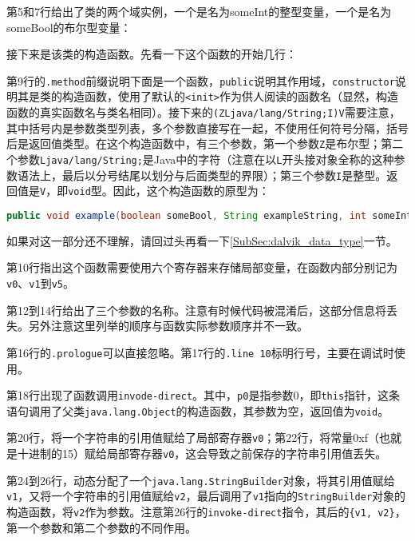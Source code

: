 第5和7行给出了类的两个域实例，一个是名为someInt的整型变量，一个是名为someBool的布尔型变量：


接下来是该类的构造函数。先看一下这个函数的开始几行：

第9行的\lstinline!.method!前缀说明下面是一个函数，\lstinline!public!说明其作用域，\lstinline!constructor!说明其是类的构造函数，使用了默认的\lstinline!<init>!作为供人阅读的函数名（显然，构造函数的真实函数名与类名相同）。接下来的\lstinline!(ZLjava/lang/String;I)V!需要注意，其中括号内是参数类型列表，多个参数直接写在一起，不使用任何符号分隔，括号后是返回值类型。在这个构造函数中，有三个参数，第一个参数\lstinline!Z!是布尔型；第二个参数\lstinline!Ljava/lang/String;!是Java中的字符（注意在以\lstinline!L!开头接对象全称的这种参数语法上，最后以分号结尾以划分与后面类型的界限）；第三个参数\lstinline!I!是整型。返回值是\lstinline!V!，即\lstinline!void!型。因此，这个构造函数的原型为：
\begin{lstlisting}[language=java, numbers=none]
public void example(boolean someBool, String exampleString, int someInt);
\end{lstlisting}
如果对这一部分还不理解，请回过头再看一下\ref{SubSec:dalvik_data_type}一节。

第10行指出这个函数需要使用六个寄存器来存储局部变量，在函数内部分别记为\lstinline!v0!、\lstinline!v1!到\lstinline!v5!。

第12到14行给出了三个参数的名称。注意有时候代码被混淆后，这部分信息将丢失。另外注意这里列举的顺序与函数实际参数顺序并不一致。


第16行的\lstinline!.prologue!可以直接忽略。第17行的\lstinline!.line 10!标明行号，主要在调试时使用。

第18行出现了函数调用\lstinline!invode-direct!。其中，\lstinline!p0!是指参数0，即\lstinline!this!指针，这条语句调用了父类\lstinline!java.lang.Object!的构造函数，其参数为空，返回值为\lstinline!void!。


第20行，将一个字符串的引用值赋给了局部寄存器\lstinline!v0!；第22行，将常量0xf（也就是十进制的15）赋给局部寄存器\lstinline!v0!，这会导致之前保存的字符串引用值丢失。

第24到26行，动态分配了一个\lstinline!java.lang.StringBuilder!对象，将其引用值赋给\lstinline!v1!，又将一个字符串的引用值赋给\lstinline!v2!，最后调用了\lstinline!v1!指向的\lstinline!StringBuilder!对象的构造函数，将\lstinline!v2!作为参数。注意第26行的\lstinline!invoke-direct!指令，其后的\lstinline!{v1, v2}!，第一个参数和第二个参数的不同作用。

